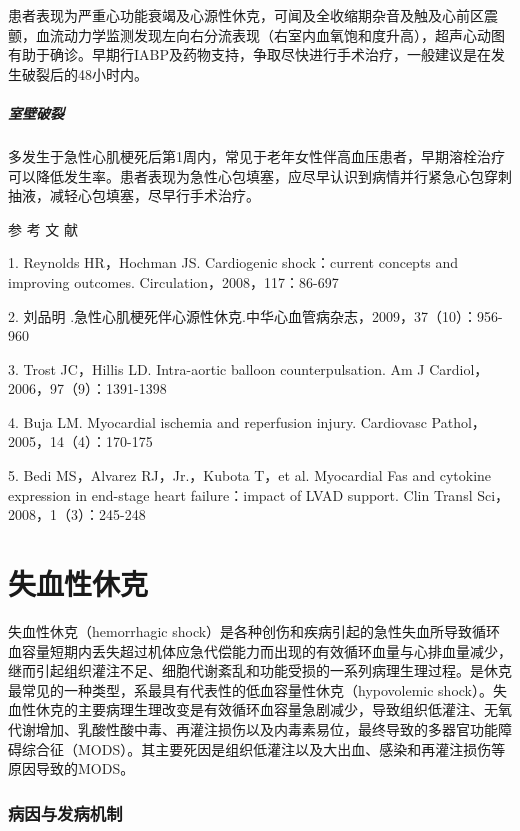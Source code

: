 患者表现为严重心功能衰竭及心源性休克，可闻及全收缩期杂音及触及心前区震颤，血流动力学监测发现左向右分流表现（右室内血氧饱和度升高），超声心动图有助于确诊。早期行IABP及药物支持，争取尽快进行手术治疗，一般建议是在发生破裂后的48小时内。

\paragraph{室壁破裂}

多发生于急性心肌梗死后第1周内，常见于老年女性伴高血压患者，早期溶栓治疗可以降低发生率。患者表现为急性心包填塞，应尽早认识到病情并行紧急心包穿刺抽液，减轻心包填塞，尽早行手术治疗。

\protect\hypertarget{text00060.html}{}{}

\hypertarget{text00060.htmlux5cux23CHP2-3-4}{}
参 考 文 献

1. Reynolds HR，Hochman JS. Cardiogenic shock：current concepts and
improving outcomes. Circulation，2008，117：86-697

2. 刘品明
.急性心肌梗死伴心源性休克.中华心血管病杂志，2009，37（10）：956-960

3. Trost JC，Hillis LD. Intra-aortic balloon counterpulsation. Am J
Cardiol，2006，97（9）：1391-1398

4. Buja LM. Myocardial ischemia and reperfusion injury. Cardiovasc
Pathol，2005，14（4）：170-175

5. Bedi MS，Alvarez RJ，Jr.，Kubota T，et al. Myocardial Fas and
cytokine expression in end-stage heart failure：impact of LVAD support.
Clin Transl Sci，2008，1（3）：245-248

\protect\hypertarget{text00061.html}{}{}

\chapter{失血性休克}

失血性休克（hemorrhagic
shock）是各种创伤和疾病引起的急性失血所导致循环血容量短期内丢失超过机体应急代偿能力而出现的有效循环血量与心排血量减少，继而引起组织灌注不足、细胞代谢紊乱和功能受损的一系列病理生理过程。是休克最常见的一种类型，系最具有代表性的低血容量性休克（hypovolemic
shock）。失血性休克的主要病理生理改变是有效循环血容量急剧减少，导致组织低灌注、无氧代谢增加、乳酸性酸中毒、再灌注损伤以及内毒素易位，最终导致的多器官功能障碍综合征（MODS）。其主要死因是组织低灌注以及大出血、感染和再灌注损伤等原因导致的MODS。

\subsection{病因与发病机制}

